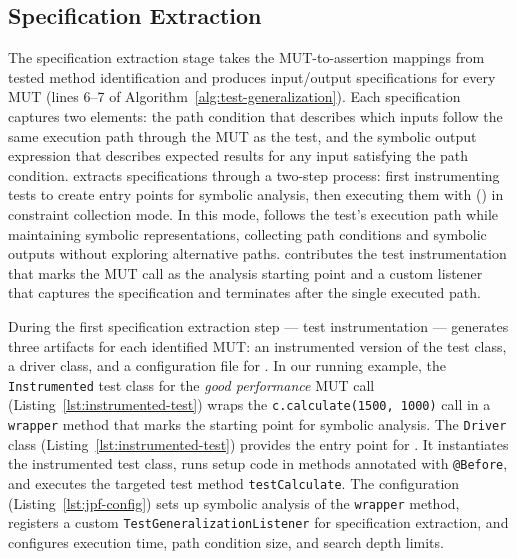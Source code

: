 \subsection{Specification Extraction}
\label{sec:specification-extraction}

The specification extraction stage takes
the MUT-to-assertion mappings from tested method identification
and produces input/output specifications for every MUT
(lines 6--7 of Algorithm~\ref{alg:test-generalization}).
Each specification captures two elements:
the path condition that describes which inputs
follow the same execution path through the MUT as the test,
and the symbolic output expression that describes expected results
for any input satisfying the path condition.
\ToolTeralizer{} extracts specifications through a two-step process:
first instrumenting tests to create entry points for symbolic analysis,
then executing them with \ToolSPFLong{} (\ToolSPF{}) in constraint collection mode.
In this mode, \ToolSPF{} follows the test's execution path
while maintaining symbolic representations,
collecting path conditions and symbolic outputs without exploring alternative paths.
\ToolTeralizer{} contributes the test instrumentation
that marks the MUT call as the analysis starting point
and a custom listener that captures the specification
and terminates \ToolSPF{} after the single executed path.

During the first specification extraction step --- test instrumentation ---
\ToolTeralizer{} generates three artifacts for each identified MUT:
an instrumented version of the test class,
a driver class, 
and a configuration file for \ToolSPF{}.
In our running example,
the \texttt{Instrumented} test class 
for the \textit{good performance} MUT call
(Listing~\ref{lst:instrumented-test})
wraps the \texttt{c.calculate(1500, 1000)} call
in a \texttt{wrapper} method that marks the starting point for symbolic analysis.
The \texttt{Driver} class (Listing~\ref{lst:instrumented-test})
provides the entry point for \ToolSPF{}.
It instantiates the instrumented test class,
runs setup code in methods annotated with \texttt{@Before},
and executes the targeted test method \texttt{testCalculate}.
The \ToolSPF{} configuration (Listing~\ref{lst:jpf-config})
sets up symbolic analysis of the \texttt{wrapper} method,
registers a custom \texttt{TestGeneralizationListener} for specification extraction,
and configures execution time, path condition size, and search depth limits.

